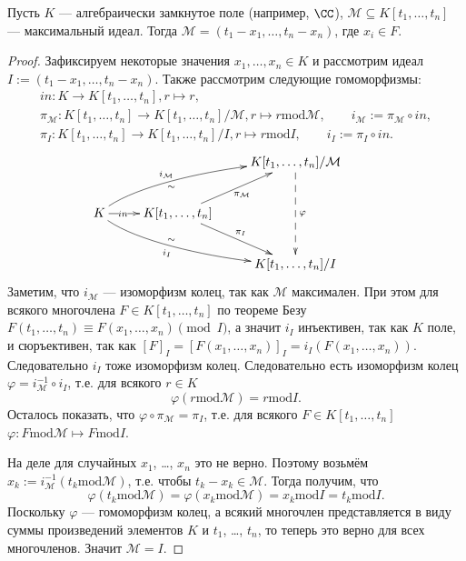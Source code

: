 \documentclass[12pt,a4paper]{article}
\renewcommand{\mod}{\mathrm{mod}}
\begin{document}
    \begin{theorem}
        Пусть $K$ --- алгебраически замкнутое поле (например, $\CC$), $\mathcal{M} \subseteq K[t_1, \dots, t_n]$ --- максимальный идеал. Тогда $\mathcal{M} = (t_1-x_1, \dots, t_n-x_n)$, где $x_i \in F$.
    \end{theorem}

    \begin{proof}
        Зафиксируем некоторые значения $x_1, \dots, x_n \in K$ и рассмотрим идеал $I := (t_1 - x_1, \dots, t_n - x_n)$. Также рассмотрим следующие гомоморфизмы:
        \begin{gather*}
            in: K \to K[t_1, \dots, t_n], r \mapsto r,\\
            \pi_\mathcal{M}: K[t_1, \dots, t_n] \to K[t_1, \dots, t_n]/\mathcal{M}, r \mapsto r \mathbin{\mod} \mathcal{M}, \qquad i_\mathcal{M} := \pi_\mathcal{M} \circ in,\\
            \pi_I: K[t_1, \dots, t_n] \to K[t_1, \dots, t_n]/I, r \mapsto r \mathbin{\mod} I, \qquad i_I := \pi_I \circ in.
        \end{gather*}
        \[
            \xymatrix{
                && K[t_1, \dots, t_n]/\mathcal{M} \ar@{-->}[dd]^\varphi\\
                K \ar[r]|(0.3){in} \ar@(ur, l)[rru]^(0.4){i_\mathcal{M}}_(0.4){\sim} \ar@(dr, l)[rrd]_(0.4){i_I}^(0.4){\sim} & K[t_1, \dots, t_n] \ar[ur]_{\pi_\mathcal{M}} \ar[dr]^{\pi_I}\\
                && K[t_1, \dots, t_n]/I &
            }
        \]
        Заметим, что $i_\mathcal{M}$ --- изоморфизм колец, так как $\mathcal{M}$ максимален. При этом для всякого многочлена $F \in K[t_1, \dots, t_n]$ по теореме Безу $F(t_1, \dots, t_n) \equiv F(x_1, \dots, x_n) \pmod{I}$, а значит $i_I$ инъективен, так как $K$ поле, и сюръективен, так как $[F]_I = [F(x_1, \dots, x_n)]_I = i_I(F(x_1, \dots, x_n))$. Следовательно $i_I$ тоже изоморфизм колец. Следовательно есть изоморфизм колец $\varphi = i_\mathcal{M}^{-1} \circ i_I$, т.е. для всякого $r \in K$
        \[\varphi(r \mathbin{\mod} \mathcal{M}) = r \mathbin{\mod} I.\]
        Осталось показать, что $\varphi \circ \pi_\mathcal{M} = \pi_I$, т.е. для всякого $F \in K[t_1, \dots, t_n]$ $\varphi: F \mathbin{\mod} \mathcal{M} \mapsto F \mathbin{\mod} I$.

        На деле для случайных $x_1$, \dots, $x_n$ это не верно. Поэтому возьмём $x_k := i_\mathcal{M}^{-1}(t_k \mathbin{\mod} \mathcal{M})$, т.е. чтобы $t_k - x_k \in \mathcal{M}$. Тогда получим, что
        \[\varphi(t_k \mathbin{\mod} \mathcal{M}) = \varphi(x_k \mathbin{\mod} \mathcal{M}) = x_k \mathbin{\mod} I = t_k \mathbin{\mod} I.\]
        Поскольку $\varphi$ --- гомоморфизм колец, а всякий многочлен представляется в виду суммы произведений элементов $K$ и $t_1$, \dots, $t_n$, то теперь это верно для всех многочленов. Значит $\mathcal{M} = I$.


\end{proof}
\end{document}
